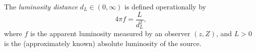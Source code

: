 The \emph{luminosity distance} $d_L \in (0, \infty)$ is defined operationally by
$$4\pi f = \frac{L}{d_L^2},$$
where $f$ is the apparent luminosity measured by an observer $(z, Z)$, and $L > 0$ is the (approximately known) absolute luminosity of the source.
